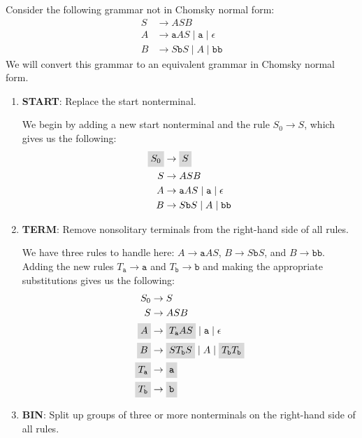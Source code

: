 \begin{example}
Consider the following grammar not in Chomsky normal form:
\begin{align*}
S	&\rightarrow ASB \\
A	&\rightarrow \texttt{a}AS \mid \texttt{a} \mid \epsilon \\
B	&\rightarrow S\texttt{b}S \mid A \mid \texttt{bb}
\end{align*}
We will convert this grammar to an equivalent grammar in Chomsky normal form.

\begin{enumerate}
\item \textbf{START}: Replace the start nonterminal.

We begin by adding a new start nonterminal and the rule $S_{0} \rightarrow S$, which gives us the following:
\begin{align*}
\highlightmath{S_{0}}	&\rightarrow \highlightmath{S} \\
S				&\rightarrow ASB \\
A				&\rightarrow \texttt{a}AS \mid \texttt{a} \mid \epsilon \\
B				&\rightarrow S\texttt{b}S \mid A \mid \texttt{bb}
\end{align*}

\item \textbf{TERM}: Remove nonsolitary terminals from the right-hand side of all rules.

We have three rules to handle here: $A \rightarrow \texttt{a}AS$, $B \rightarrow S\texttt{b}S$, and $B \rightarrow \texttt{bb}$. Adding the new rules $T_{\texttt{a}} \rightarrow \texttt{a}$ and $T_{\texttt{b}} \rightarrow \texttt{b}$ and making the appropriate substitutions gives us the following:
\begin{align*}
S_{0}					&\rightarrow S \\
S						&\rightarrow ASB \\
\highlightmath{A}			&\rightarrow \highlightmath{T_{\texttt{a}}AS} \mid \texttt{a} \mid \epsilon \\
\highlightmath{B}			&\rightarrow \highlightmath{ST_{\texttt{b}}S} \mid A \mid \highlightmath{T_{\texttt{b}}T_{\texttt{b}}} \\
\highlightmath{T_{\texttt{a}}}	&\rightarrow \highlightmath{\texttt{a}} \\
\highlightmath{T_{\texttt{b}}}	&\rightarrow \highlightmath{\texttt{b}}
\end{align*}

\item \textbf{BIN}: Split up groups of three or more nonterminals on the right-hand side of all rules.


\end{enumerate}
\end{example}

